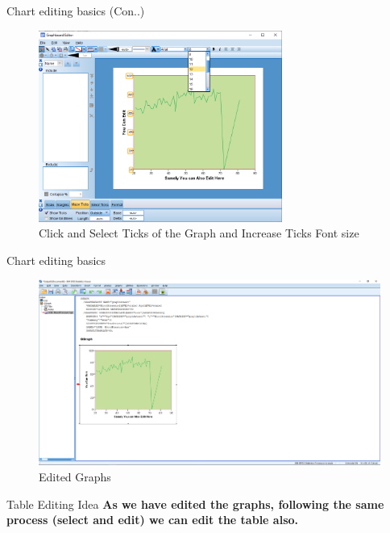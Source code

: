 \begin{frame}[t]{Chart editing basics (Con..)}
	\begin{figure}
		\centering
		\includegraphics[width=8cm]{img/edit_chart-10}
		\caption{Click and Select Ticks of the Graph and Increase Ticks Font size}
	\end{figure}
\end{frame}
\begin{frame}[t]{Chart editing basics}
	\begin{figure}
		\centering
		\includegraphics[width=12cm]{img/edit_chart-11}
		\caption{Edited Graphs}
	\end{figure}
\end{frame}

\begin{frame}[t]{Table Editing Idea}
	\textbf{As we have edited the  graphs, following the same process (select and edit) we can edit the table also.}
\end{frame}










